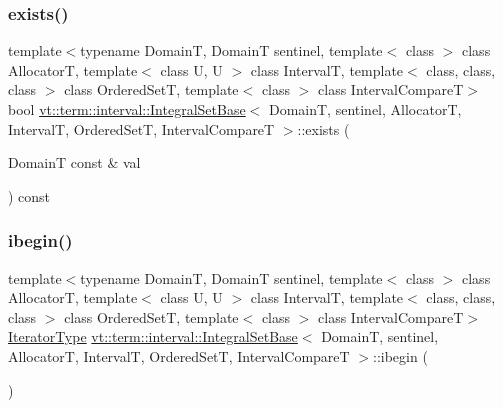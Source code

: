 \mbox{\label{structvt_1_1term_1_1interval_1_1_integral_set_base_a4f5f1203eb50e1ebaccc479b16af89a1}} 
\subsubsection{\texorpdfstring{exists()}{exists()}}
{\footnotesize\ttfamily template$<$typename DomainT, DomainT sentinel, template$<$ class $>$ class AllocatorT, template$<$ class U, U $>$ class IntervalT, template$<$ class, class, class $>$ class Ordered\+SetT, template$<$ class $>$ class Interval\+CompareT$>$ \\
bool \hyperlink{structvt_1_1term_1_1interval_1_1_integral_set_base}{vt\+::term\+::interval\+::\+Integral\+Set\+Base}$<$ DomainT, sentinel, AllocatorT, IntervalT, Ordered\+SetT, Interval\+CompareT $>$\+::exists (\begin{DoxyParamCaption}\item[{DomainT const \&}]{val }\end{DoxyParamCaption}) const\hspace{0.3cm}{\ttfamily [inline]}}

\mbox{\label{structvt_1_1term_1_1interval_1_1_integral_set_base_a3e9dc82d28ecca2c84edac4c80e6c433}} 
\subsubsection{\texorpdfstring{ibegin()}{ibegin()}}
{\footnotesize\ttfamily template$<$typename DomainT, DomainT sentinel, template$<$ class $>$ class AllocatorT, template$<$ class U, U $>$ class IntervalT, template$<$ class, class, class $>$ class Ordered\+SetT, template$<$ class $>$ class Interval\+CompareT$>$ \\
\hyperlink{structvt_1_1term_1_1interval_1_1_integral_set_base_a111b2ec1ea960a40ba4270be702f11f1}{Iterator\+Type} \hyperlink{structvt_1_1term_1_1interval_1_1_integral_set_base}{vt\+::term\+::interval\+::\+Integral\+Set\+Base}$<$ DomainT, sentinel, AllocatorT, IntervalT, Ordered\+SetT, Interval\+CompareT $>$\+::ibegin (\begin{DoxyParamCaption}{ }\end{DoxyParamCaption})\hspace{0.3cm}{\ttfamily [inline]}}

